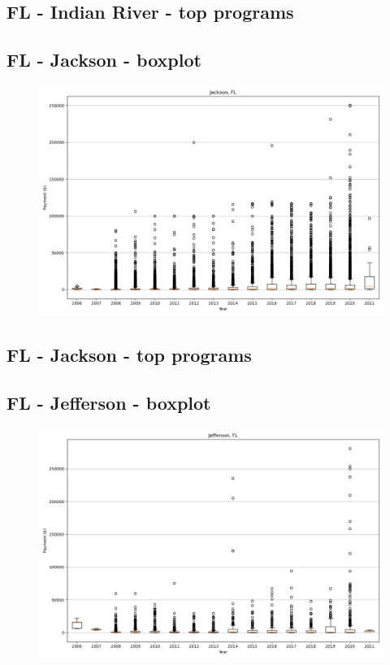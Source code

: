 \subsection*{FL - Indian River - top programs}

\newpage
\subsection*{FL - Jackson - boxplot}
\begin{figure}[h]
\centering
\includegraphics[width=7in]{../output/boxplots/counties/Jackson-FL_boxplot.png}
\end{figure}


\subsection*{FL - Jackson - top programs}

\newpage
\subsection*{FL - Jefferson - boxplot}
\begin{figure}[h]
\centering
\includegraphics[width=7in]{../output/boxplots/counties/Jefferson-FL_boxplot.png}
\end{figure}


